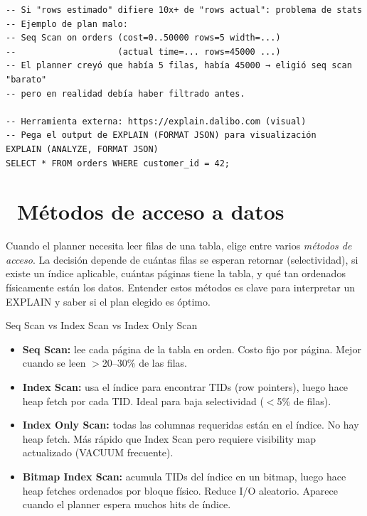 \begin{lstlisting}[caption={Detectar estimaciones malas}]
-- Si "rows estimado" difiere 10x+ de "rows actual": problema de stats
-- Ejemplo de plan malo:
-- Seq Scan on orders (cost=0..50000 rows=5 width=...)
--                    (actual time=... rows=45000 ...)
-- El planner creyó que había 5 filas, había 45000 → eligió seq scan "barato"
-- pero en realidad debía haber filtrado antes.

-- Herramienta externa: https://explain.dalibo.com (visual)
-- Pega el output de EXPLAIN (FORMAT JSON) para visualización
EXPLAIN (ANALYZE, FORMAT JSON)
SELECT * FROM orders WHERE customer_id = 42;
\end{lstlisting}

\section[Métodos de acceso a datos]{~Métodos de acceso a datos}

Cuando el planner necesita leer filas de una tabla, elige entre varios \emph{métodos de acceso}.
La decisión depende de cuántas filas se esperan retornar (selectividad), si existe un índice aplicable, cuántas páginas tiene la tabla, y qué tan ordenados físicamente están los datos.
Entender estos métodos es clave para interpretar un EXPLAIN y saber si el plan elegido es óptimo.

\begin{teoriabox}{Seq Scan vs Index Scan vs Index Only Scan}
\begin{itemize}
  \item \textbf{Seq Scan:} lee cada página de la tabla en orden. Costo fijo por página. Mejor cuando se leen $>$20--30\% de las filas.
  \item \textbf{Index Scan:} usa el índice para encontrar TIDs (row pointers), luego hace heap fetch por cada TID. Ideal para baja selectividad ($<$5\% de filas).
  \item \textbf{Index Only Scan:} todas las columnas requeridas están en el índice. No hay heap fetch. Más rápido que Index Scan pero requiere visibility map actualizado (VACUUM frecuente).
  \item \textbf{Bitmap Index Scan:} acumula TIDs del índice en un bitmap, luego hace heap fetches ordenados por bloque físico. Reduce I/O aleatorio. Aparece cuando el planner espera muchos hits de índice.
\end{itemize}
\end{teoriabox}

